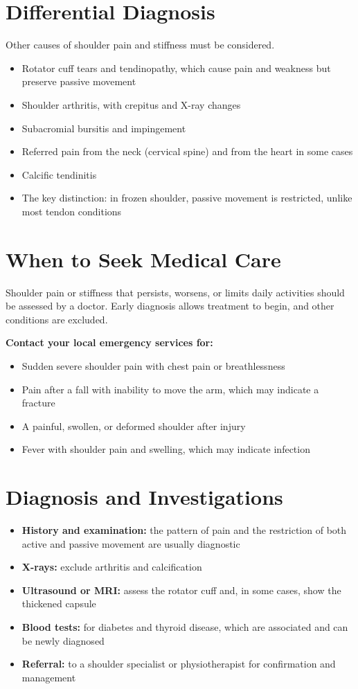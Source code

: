 \section*{Differential Diagnosis}
Other causes of shoulder pain and stiffness must be considered.
\begin{itemize}
    \item Rotator cuff tears and tendinopathy, which cause pain and weakness but preserve passive movement
    \item Shoulder arthritis, with crepitus and X-ray changes
    \item Subacromial bursitis and impingement
    \item Referred pain from the neck (cervical spine) and from the heart in some cases
    \item Calcific tendinitis
    \item The key distinction: in frozen shoulder, passive movement is restricted, unlike most tendon conditions
\end{itemize}

\section*{When to Seek Medical Care}
Shoulder pain or stiffness that persists, worsens, or limits daily activities should be assessed by a doctor. Early diagnosis allows treatment to begin, and other conditions are excluded.

\textbf{Contact your local emergency services for:}
\begin{itemize}
    \item Sudden severe shoulder pain with chest pain or breathlessness
    \item Pain after a fall with inability to move the arm, which may indicate a fracture
    \item A painful, swollen, or deformed shoulder after injury
    \item Fever with shoulder pain and swelling, which may indicate infection
\end{itemize}

\section*{Diagnosis and Investigations}
\begin{itemize}
    \item \textbf{History and examination:} the pattern of pain and the restriction of both active and passive movement are usually diagnostic
    \item \textbf{X-rays:} exclude arthritis and calcification
    \item \textbf{Ultrasound or MRI:} assess the rotator cuff and, in some cases, show the thickened capsule
    \item \textbf{Blood tests:} for diabetes and thyroid disease, which are associated and can be newly diagnosed
    \item \textbf{Referral:} to a shoulder specialist or physiotherapist for confirmation and management
\end{itemize}

